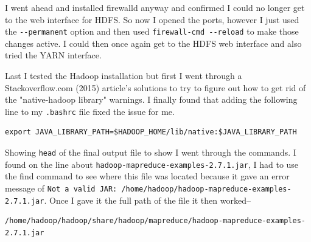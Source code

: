 \documentclass[10pt]{article}
\begin{document}
\par
I went ahead and installed firewalld anyway and confirmed I could no longer get to the web interface for HDFS. So now I opened the ports, however I just used the \verb|--permanent| option and then used \verb|firewall-cmd --reload| to make those changes active. I could then once again get to the HDFS web interface and also tried the YARN interface.
\par
{}%
\hfill
{}%
\par
Last I tested the Hadoop installation but first I went through a Stackoverflow.com (2015) article's solutions to try to figure out how to get rid of the "native-hadoop library" warnings. I finally found that adding the following line to my \verb|.bashrc| file fixed the issue for me.
\begin{verbatim}
export JAVA_LIBRARY_PATH=$HADOOP_HOME/lib/native:$JAVA_LIBRARY_PATH
\end{verbatim}
Showing \verb|head| of the final output file to show I went through the commands. I found on the line about \verb|hadoop-mapreduce-examples-2.7.1.jar|, I had to use the find command to see where this file was located because it gave an error message of \verb|Not a valid JAR: /home/hadoop/hadoop-mapreduce-examples-2.7.1.jar|. Once I gave it the full path of the file it then worked--
\begin{verbatim}
/home/hadoop/hadoop/share/hadoop/mapreduce/hadoop-mapreduce-examples-2.7.1.jar
\end{verbatim}
\end{document}
